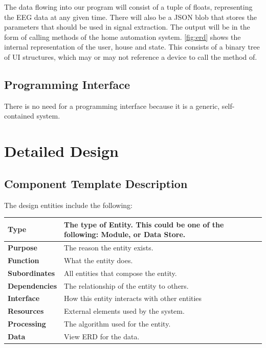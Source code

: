 \documentclass{article}
\begin{document}
The data flowing into our program will consist of a tuple of floats,
representing the EEG data at any given time. There will also be a JSON blob
that stores the parameters that should be used in signal extraction. The
output will be in the form of calling methods of the home automation system.
\autoref{fig:erd} shows the internal representation of the user, house and
state. This consists of a binary tree of UI structures, which may or may not
reference a device to call the method of.

\subsection{Programming Interface} 
There is no need for a programming interface because it is a generic, self-contained system.

\newpage

\section{Detailed Design}

\subsection{Component Template Description}

The design entities include the following:

\begin{tabular}{ | l |  p{13.3cm} |}
\hline
\textbf{Type} & The type of Entity. This could be one of the following: Module, or Data Store. \\ \hline
\textbf{Purpose} & The reason the entity exists.  \\ \hline
\textbf{Function} & What the entity does. \\ \hline
\textbf{Subordinates} & All entities that compose the entity. \\ \hline
\textbf{Dependencies} & The relationship of the entity to others. \\ \hline
\textbf{Interface} & How this entity interacts with other entities \\ \hline
\textbf{Resources} & External elements used by the system. \\ \hline
\textbf{Processing} & The algorithm used for the entity. \\ \hline
\textbf{Data} & View ERD for the data. \\ \hline
\end{tabular}
\end{document}
